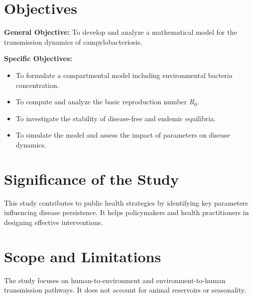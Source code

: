\documentclass[a4paper,12pt]{report}
\begin{document}
\section{ Objectives}
\textbf{General Objective:} To develop and analyze a mathematical model for the transmission dynamics of campylobacteriosis.

\textbf{Specific Objectives:}
\begin{itemize}
  \item To formulate a compartmental model including environmental bacteria concentration.
  \item To compute and analyze the basic reproduction number $R_0$.
  \item To investigate the stability of disease-free and endemic equilibria.
  \item To simulate the model and assess the impact of parameters on disease dynamics.
\end{itemize}

\section{ Significance of the Study}
This study contributes to public health strategies by identifying key parameters influencing disease persistence. It helps policymakers and health practitioners in designing effective interventions.

\section{ Scope and Limitations}
The study focuses on human-to-environment and environment-to-human transmission pathways. It does not account for animal reservoirs or seasonality.
\end{document}
